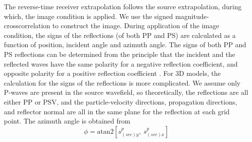 \documentclass[manuscript,ulem,graphix,revised]{geophysics}
\begin{document}


The reverse-time receiver extrapolation follows the source extrapolation, during which, the image condition is applied. We use the signed magnitude-crosscorrelation to construct the image. 
During application of the image condition, the signs of the reflections (of both PP and PS) are calculated as a function of position, incident angle and azimuth angle.
The signs of both PP and PS reflections can be determined from the principle that the incident and the reflected waves have the same polarity for a negative reflection coefficient, and opposite polarity for a positive reflection coefficient \citep{aki80}. For 3D models, the calculation for the signs of the reflections is more complicated. 
We assume only P-waves are present in the source wavefield, so theoretically, the reflections are all either PP or PSV, and the particle-velocity directions, propagation directions, and reflector normal are all in the same plane for the reflection at each grid point. The azimuth angle is obtained from 
\begin{equation}
\phi=\mathrm{atan2}[s^{p}_{(src)y},\ s^{p}_{(src)x}]
\label{eqn:azm_agl}
\end{equation}
\end{document}
